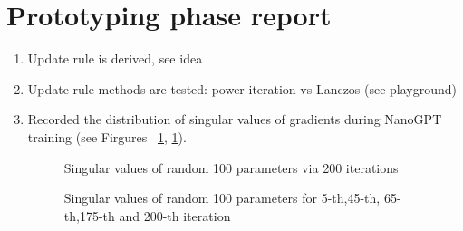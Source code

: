 \documentclass[]{scrartcl}
\begin{document}
\section{Prototyping phase report}
\begin{enumerate}
    \item Update rule is derived, see idea
    \item Update rule methods are tested: power iteration vs Lanczos (see playground)
    \item Recorded the distribution of singular values of gradients during NanoGPT training (see Firgures ~\ref{fig:svd_all}, \ref{fig:svd_all}).
    \begin{figure}[h!]
        \caption{Singular values of random 100 parameters via 200 iterations}
        \label{fig:svd_all}
    \end{figure}
    \begin{figure}[h!]
        \caption{Singular values of random 100 parameters for 5-th,45-th, 65-th,175-th and 200-th iteration}
        \label{fig:svd}
    \end{figure} 
    

\end{enumerate}
\end{document}
